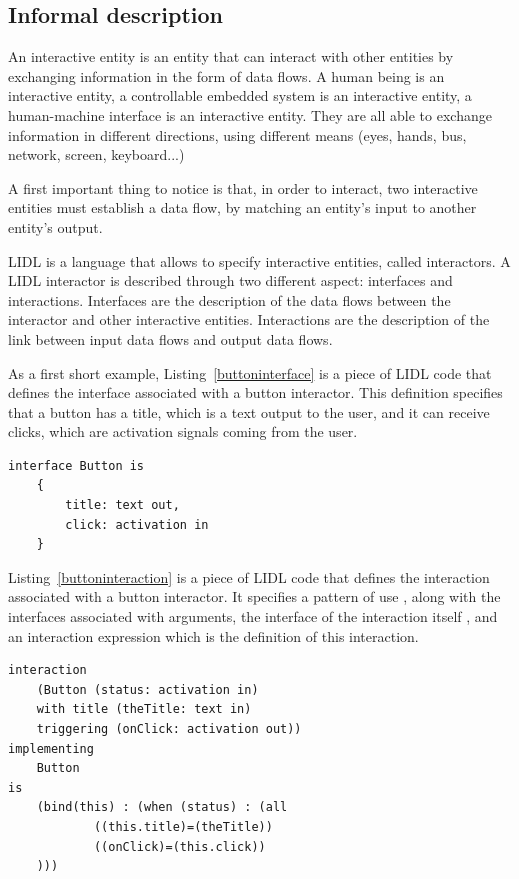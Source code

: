 \subsection{Informal description}

An interactive entity is an entity that can interact with other entities by exchanging information in the form of data flows. A human being is an interactive entity, a controllable embedded system is an interactive entity, a human-machine interface is an interactive entity. They are all able to exchange information in different directions, using different means (eyes, hands, bus, network, screen, keyboard...)


A first important thing to notice is that, in order to interact, two interactive entities must establish a data flow, by matching an entity's input to another entity's output.

LIDL is a language that allows to specify interactive entities, called interactors. A LIDL interactor is described through two different aspect: interfaces and interactions. Interfaces are the description of the data flows between the interactor and other interactive entities. Interactions are the description of the link between input data flows and output data flows.

As a first short example, Listing~\ref{buttoninterface} is a piece of LIDL code that defines the interface associated with a button interactor. This definition specifies that a button has a title, which is a text output to the user, and it can receive clicks, which are activation signals coming from the user.

\begin{lstlisting}[caption=Interface of the speed controller,label=buttoninterface]
interface Button is
	{
		title: text out,
		click: activation in	
	}
\end{lstlisting}

Listing~\ref{buttoninteraction} is a piece of LIDL code that defines the interaction associated with a button interactor. It specifies a pattern of use , along with the interfaces associated with arguments, the interface of the interaction itself , and an interaction expression which is the definition of this interaction.


\begin{lstlisting}[caption=Interaction of a button,label=buttoninteraction]
interaction 
	(Button (status: activation in) 
	with title (theTitle: text in) 
	triggering (onClick: activation out))
implementing
	Button
is
	(bind(this) : (when (status) : (all
			((this.title)=(theTitle))
			((onClick)=(this.click))
	)))
\end{lstlisting}


